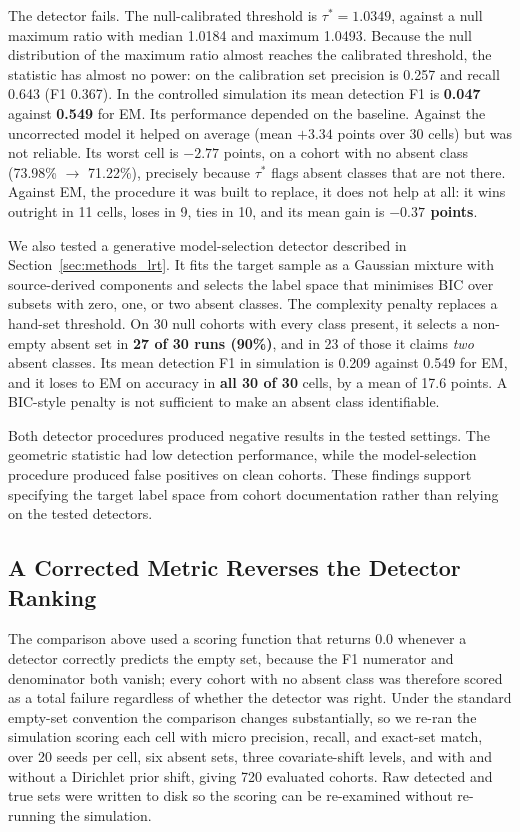 \documentclass[10pt,journal,compsoc,twocolumn]{IEEEtran}
\begin{document}
The detector fails. The null-calibrated threshold is $\tau^* = 1.0349$, against a null maximum ratio with median 1.0184 and maximum 1.0493. Because the null distribution of the maximum ratio almost reaches the calibrated threshold, the statistic has almost no power: on the calibration set precision is 0.257 and recall 0.643 (F1 0.367). In the controlled simulation its mean detection F1 is \textbf{0.047} against \textbf{0.549} for EM. Its performance depended on the baseline. Against the uncorrected model it helped on average (mean $+3.34$ points over 30 cells) but was not reliable. Its worst cell is $-2.77$ points, on a cohort with no absent class (73.98\% $\rightarrow$ 71.22\%), precisely because $\tau^*$ flags absent classes that are not there. Against EM, the procedure it was built to replace, it does not help at all: it wins outright in 11 cells, loses in 9, ties in 10, and its mean gain is \textbf{$-0.37$ points}.

We also tested a generative model-selection detector described in Section~\ref{sec:methods_lrt}. It fits the target sample as a Gaussian mixture with source-derived components and selects the label space that minimises BIC over subsets with zero, one, or two absent classes. The complexity penalty replaces a hand-set threshold. On 30 null cohorts with every class present, it selects a non-empty absent set in \textbf{27 of 30 runs (90\%)}, and in 23 of those it claims \emph{two} absent classes. Its mean detection F1 in simulation is 0.209 against 0.549 for EM, and it loses to EM on accuracy in \textbf{all 30 of 30} cells, by a mean of 17.6 points. A BIC-style penalty is not sufficient to make an absent class identifiable.

Both detector procedures produced negative results in the tested settings. The geometric statistic had low detection performance, while the model-selection procedure produced false positives on clean cohorts. These findings support specifying the target label space from cohort documentation rather than relying on the tested detectors.

\subsection{A Corrected Metric Reverses the Detector Ranking}
\label{sec:detector_v2}

The comparison above used a scoring function that returns 0.0 whenever a detector correctly predicts the empty set, because the F1 numerator and denominator both vanish; every cohort with no absent class was therefore scored as a total failure regardless of whether the detector was right. Under the standard empty-set convention the comparison changes substantially, so we re-ran the simulation scoring each cell with micro precision, recall, and exact-set match, over 20 seeds per cell, six absent sets, three covariate-shift levels, and with and without a Dirichlet prior shift, giving 720 evaluated cohorts. Raw detected and true sets were written to disk so the scoring can be re-examined without re-running the simulation.
\end{document}
